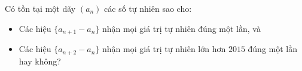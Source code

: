 \ifshowproblem
\begin{problem}\label{example:RUS-2015-TMO-J-P6}
    Có tồn tại một dãy \( (a_n) \) các số tự nhiên sao cho:
    \begin{itemize}[topsep=0pt, partopsep=0pt, itemsep=0pt]
        \item Các hiệu \( \{a_{n+1} - a_n\} \) nhận mọi giá trị tự nhiên đúng một lần, và
        \item Các hiệu \( \{a_{n+2} - a_n\} \) nhận mọi giá trị tự nhiên lớn hơn \( 2015 \) đúng một lần hay không?
    \end{itemize}
\end{problem}
\fi

\footnotemark
{}
\fi